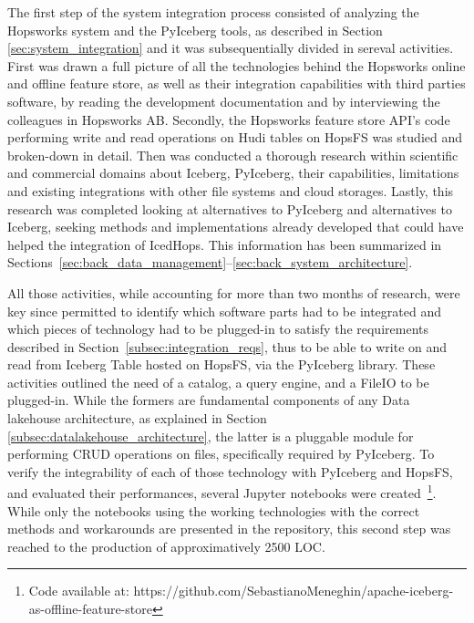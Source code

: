 The first step of the system integration process consisted of analyzing the Hopsworks system and the PyIceberg tools, as described in Section \ref{sec:system_integration} and it was subsequentially divided in sereval activities. First was drawn a full picture of all the technologies behind the Hopsworks online and offline feature store, as well as their integration capabilities with third parties software, by reading the development documentation and by interviewing the colleagues in Hopsworks AB. Secondly, the Hopsworks feature store \gls{API}'s code performing write and read operations on Hudi tables on \gls{HopsFS} was studied and broken-down in detail. Then was conducted a thorough research within scientific and commercial domains about Iceberg, PyIceberg, their capabilities, limitations and existing integrations with other file systems and cloud storages. Lastly, this research was completed looking at alternatives to PyIceberg and alternatives to Iceberg, seeking methods and implementations already developed that could have helped the integration of IcedHops. This information has been summarized in Sections~\ref{sec:back_data_management}--\ref{sec:back_system_architecture}.

All those activities, while accounting for more than two months of research, were key since permitted to identify which software parts had to be integrated and which pieces of technology had to be plugged-in to satisfy the requirements described in Section~\ref{subsec:integration_reqs}, thus to be able to write on and read from Iceberg Table hosted on \gls{HopsFS}, via the PyIceberg library. These activities outlined the need of a catalog, a query engine, and a FileIO to be plugged-in. While the formers are fundamental components of any Data lakehouse architecture, as explained in Section \ref{subsec:datalakehouse_architecture}, the latter is a pluggable module for performing \gls{CRUD} operations on files, specifically required by PyIceberg. To verify the integrability of each of those technology with PyIceberg and HopsFS, and evaluated their performances, several Jupyter notebooks were created~\footnote{Code available at: https://github.com/SebastianoMeneghin/apache-iceberg-as-offline-feature-store}. While only the notebooks using the working technologies with the correct methods and workarounds are presented in the repository, this second step was reached to the production of approximatively 2500 \gls{LOC}.

